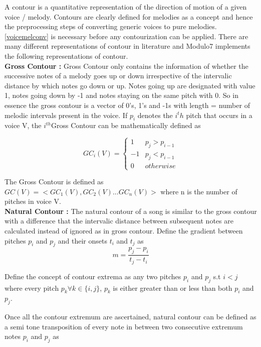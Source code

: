 \noindent A contour is a quantitative representation of the direction of motion of a given voice / melody. Contours are clearly defined for melodies as a concept and hence the preprocessing steps of converting generic voices to pure melodies.\ref{voicemelconv} is necessary before any contourization can be applied. There are many different representations of contour in literature and Modulo7 implements the following representations of contour. \\

\noindent \textbf{Gross Contour : } Gross Contour only contains the information of whether the successive notes of a melody goes up or down irrespective of the intervalic distance by which notes go down or up. Notes going up are designated with value 1, notes going down by -1 and notes staying on the same pitch with 0. So in essence the gross contour is a vector of 0's, 1's and -1s with length = number of melodic intervals present in the voice. If $p_i$ denotes the $i^th$ pitch that occurs in a voice V, the $i^{th}$Gross Contour can be mathematically defined as 

\begin{equation}
GC_i(V) = \begin{cases}
1 & p_j > p_{i-1} \\
-1 & p_j < p_{i-1} \\
0 & otherwise
\end{cases}
\end{equation}

\noindent The Gross Contour is defined as $GC(V) = <GC_1(V), GC_2(V) ... GC_n(V)>$ where n is the number of pitches in voice V. \\
 
\noindent \textbf{Natural Contour : } The natural contour of a song is similar to the gross contour with a difference that the intervalic distance between subsequent notes are calculated instead of ignored as in gross contour. Define the gradient between pitches $p_i$ and $p_j$ and their onsets $t_i$ and $t_j$ as \cite{similietechnicalmanual}
\begin{equation}
m = \frac{p_j - p_i}{t_j - t_i}
\end{equation} 

\noindent Define the concept of contour extrema as any two pitches $p_i$ and $p_j$ s.t $i < j$ where every pitch $p_k \forall k \in \{i, j\}$, $p_k$ is either greater than or less than both $p_i$ and $p_j$.

\noindent Once all the contour extremum are ascertained, natural contour can be defined as a semi tone transposition of every note in between two consecutive extremum notes $p_i$ and $p_j$ as

